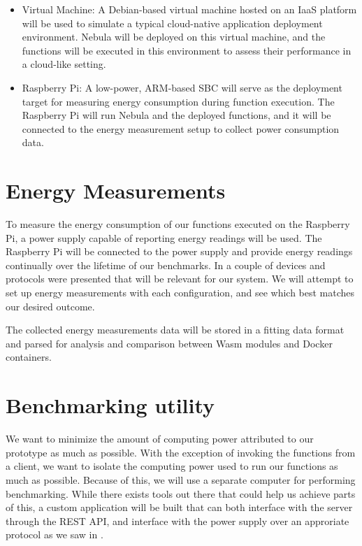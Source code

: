\documentclass[
  table]{report}
\begin{document}
\begin{itemize}
\item
  Virtual Machine: A Debian-based virtual machine hosted on an \ac{IaaS}
  platform will be used to simulate a typical cloud-native application
  deployment environment. Nebula will be deployed on this virtual
  machine, and the functions will be executed in this environment to
  assess their performance in a cloud-like setting.
\item
  Raspberry Pi: A low-power, ARM-based \ac{SBC} will serve as the
  deployment target for measuring energy consumption during function
  execution. The Raspberry Pi will run Nebula and the deployed
  functions, and it will be connected to the energy measurement setup to
  collect power consumption data.
\end{itemize}

\section{Energy Measurements}

To measure the energy consumption of our functions executed on the
Raspberry Pi, a power supply capable of reporting energy readings will
be used. The Raspberry Pi will be connected to the power supply and
provide energy readings continually over the lifetime of our benchmarks.
In  a couple of devices and protocols were
presented that will be relevant for our system. We will attempt to set
up energy measurements with each configuration, and see which best
matches our desired outcome.

The collected energy measurements data will be stored in a fitting data
format and parsed for analysis and comparison between \ac{Wasm} modules
and Docker containers.

\section{Benchmarking utility}

We want to minimize the amount of computing power attributed to our
prototype as much as possible. With the exception of invoking the
functions from a client, we want to isolate the computing power used to
run our functions as much as possible. Because of this, we will use a
separate computer for performing benchmarking. While there exists tools
out there that could help us achieve parts of this, a custom application
will be built that can both interface with the server through the REST
API, and interface with the power supply over an approriate protocol as
we saw in .
\end{document}
